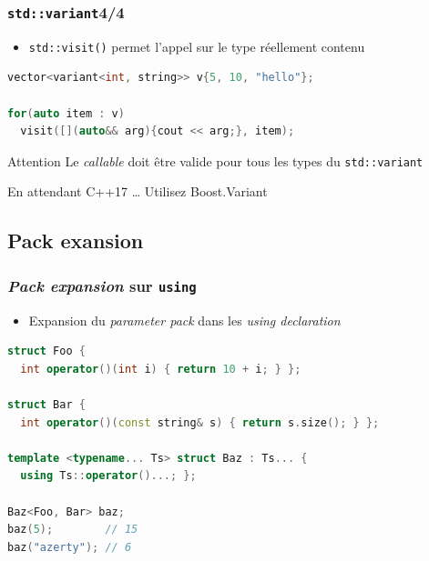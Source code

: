 \documentclass[C++.tex]{subfiles}
\begin{document}
\begin{frame}[fragile]
	\frametitle{\lstinline|std::variant|\titlehfill{}4/4}
	\begin{itemize}
		\item \lstinline|std::visit()| permet l'appel sur le type réellement contenu
	\end{itemize}

	\begin{lstlisting}[language=C++]
vector<variant<int, string>> v{5, 10, "hello"};

for(auto item : v)
  visit([](auto&& arg){cout << arg;}, item);\end{lstlisting}

	\begin{alertblock}{Attention}
		Le \textit{callable} doit être valide pour tous les types du \lstinline|std::variant| 

	\end{alertblock}

	\begin{block}{En attendant C++17 \ldots}
		Utilisez Boost.Variant
	\end{block}
\end{frame}

\subsection*{Pack exansion}
\begin{frame}[fragile]
	\frametitle{\textit{Pack expansion} sur \lstinline|using|}
	\begin{itemize}
		\item Expansion du \textit{parameter pack} dans les \textit{using declaration}
	\end{itemize}

	\begin{lstlisting}[language=C++]
struct Foo {
  int operator()(int i) { return 10 + i; } };

struct Bar {
  int operator()(const string& s) { return s.size(); } };

template <typename... Ts> struct Baz : Ts... {
  using Ts::operator()...; };

Baz<Foo, Bar> baz;
baz(5);        // 15
baz("azerty"); // 6
\end{lstlisting}
\end{frame}
\end{document}
